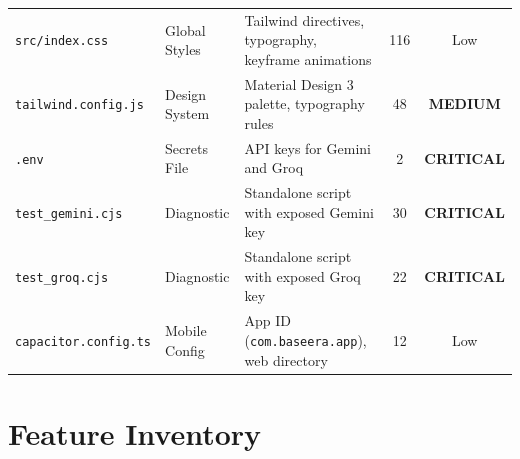 \documentclass[10pt,a4paper]{report}
\newcommand{\badgeCrit}{\colorbox{red!20}{\textcolor{critRed}{\bfseries\scriptsize CRITICAL}}}
\newcommand{\badgeMed}{\colorbox{yellow!30}{\textcolor{warnOrange!80!black}{\bfseries\scriptsize MEDIUM}}}
\begin{document}
\begin{table}[htbp]
\begin{tabularx}{\textwidth}{l p{2.5cm} X c c}
\texttt{src/index.css} & Global Styles & Tailwind directives, typography, keyframe animations & 116 & Low \\
\texttt{tailwind.config.js} & Design System & Material Design 3 palette, typography rules & 48 & \badgeMed \\
\texttt{.env} & Secrets File & API keys for Gemini and Groq & 2 & \badgeCrit \\
\texttt{test\_gemini.cjs} & Diagnostic & Standalone script with exposed Gemini key & 30 & \badgeCrit \\
\texttt{test\_groq.cjs} & Diagnostic & Standalone script with exposed Groq key & 22 & \badgeCrit \\
\texttt{capacitor.config.ts} & Mobile Config & App ID (\texttt{com.baseera.app}), web directory & 12 & Low \\
\bottomrule
\end{tabularx}
\end{table}

\chapter{Feature Inventory}
\end{document}
